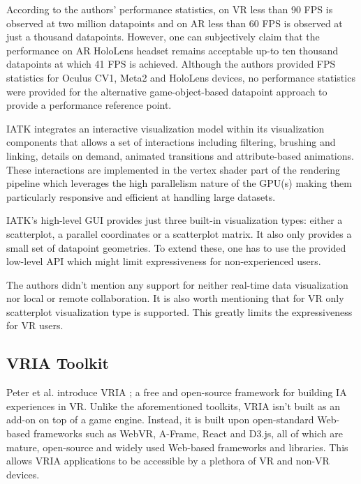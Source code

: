\documentclass{vgtc}                          %
\begin{document}
According to the authors' performance statistics, on VR less than 90 FPS is
observed at two million datapoints and on AR less than 60 FPS is observed at
just a thousand datapoints. However, one can subjectively claim that the performance on AR
HoloLens headset remains acceptable up-to ten thousand datapoints at which 41
FPS is achieved. Although the authors provided FPS statistics for Oculus CV1,
Meta2 and HoloLens devices, no performance statistics were provided for the
alternative game-object-based datapoint approach to provide a performance
reference point.

IATK integrates an interactive visualization model within its visualization
components that allows a set of interactions including filtering, brushing and
linking, details on demand, animated transitions and attribute-based animations.
These interactions are implemented in the vertex shader part of the rendering
pipeline which leverages the high parallelism nature of the GPU(s) making them
particularly responsive and efficient at handling large datasets.

IATK's high-level GUI provides just three built-in visualization types:
either a scatterplot, a parallel coordinates or a scatterplot matrix. It also
only provides a small set of datapoint geometries. To extend these, one has to
use the provided low-level API which might limit expressiveness for
non-experienced users.

The authors didn't mention any support for neither real-time data
visualization nor local or remote collaboration. It is also worth mentioning
that for VR only scatterplot visualization type is supported. This greatly
limits the expressiveness for VR users.

\subsection{VRIA Toolkit}
Peter et al. introduce VRIA \cite{vria_framework}; a free and open-source
framework for building IA experiences in VR. Unlike the aforementioned
toolkits, VRIA isn't built as an add-on on top of a game engine. Instead, it is
built upon open-standard Web-based frameworks such as WebVR, A-Frame, React and
D3.js, all of which are mature, open-source and widely used Web-based
frameworks and libraries. This allows VRIA applications to be accessible by a
plethora of VR and non-VR devices.

\smallskip
\end{document}
